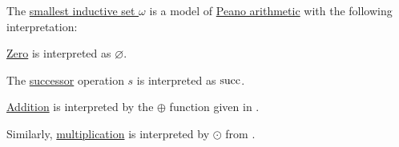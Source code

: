 \begin{theorem}\label{thm:omega_is_model_of_pa}
  The \hyperref[thm:smallest_inductive_set_existence]{smallest inductive set \( \omega \)} is a model of \hyperref[def:peano_arithmetic]{Peano arithmetic} with the following interpretation:
  \begin{thmenum}
     \hyperref[def:peano_arithmetic/zero]{Zero} is interpreted as \( \varnothing \).

     The \hyperref[def:peano_arithmetic/succ]{successor} operation \( s \) is interpreted as \( \operatorname{succ} \).

     \hyperref[def:peano_arithmetic/plus]{Addition} is interpreted by the \( \oplus \) function given in .

     Similarly, \hyperref[def:peano_arithmetic/mult]{multiplication} is interpreted by \( \odot \) from .
  \end{thmenum}
\end{theorem}
